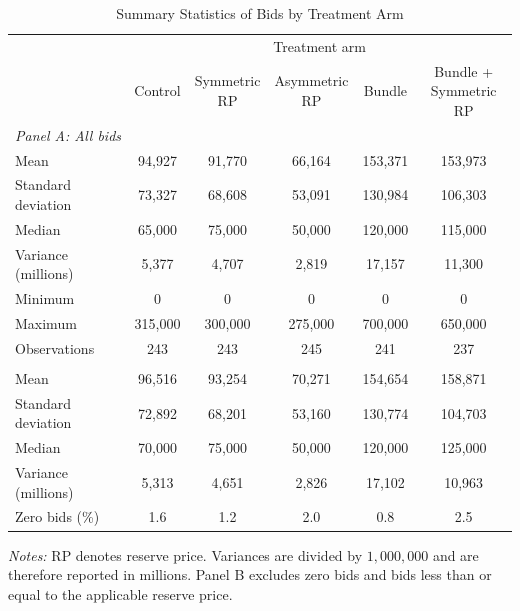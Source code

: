 \documentclass[11pt]{article}
\begin{document}
\begin{table}[!htbp]
\centering
\caption{Summary Statistics of Bids by Treatment Arm}
\label{tab:bid_summary_statistics}

\begin{adjustbox}{max width=\textwidth,
                  max totalheight=0.88\textheight,
                  keepaspectratio}
\begin{threeparttable}
\small
\renewcommand{\arraystretch}{1.10}
\setlength{\tabcolsep}{6pt}

\begin{tabular}{lccccc}
\toprule
& \multicolumn{5}{c}{Treatment arm} \\
\cmidrule(lr){2-6}
& Control
& \makecell{Symmetric\\RP}
& \makecell{Asymmetric\\RP}
& Bundle
& \makecell{Bundle +\\Symmetric RP} \\
\midrule

\multicolumn{6}{l}{\textit{Panel A: All bids}} \\[2pt]
Mean
    & 94,927 & 91,770 & 66,164 & 153,371 & 153,973 \\
Standard deviation
    & 73,327 & 68,608 & 53,091 & 130,984 & 106,303 \\
Median
    & 65,000 & 75,000 & 50,000 & 120,000 & 115,000 \\
Variance (millions)
    & 5,377 & 4,707 & 2,819 & 17,157 & 11,300 \\
Minimum
    & 0 & 0 & 0 & 0 & 0 \\
Maximum
    & 315,000 & 300,000 & 275,000 & 700,000 & 650,000 \\
Observations
    & 243 & 243 & 245 & 241 & 237 \\

\addlinespace
\multicolumn{6}{l}{\textit{Panel B: Bids above the reserve price, excluding zero bids}} \\[2pt]
Mean
    & 96,516 & 93,254 & 70,271 & 154,654 & 158,871 \\
Standard deviation
    & 72,892 & 68,201 & 53,160 & 130,774 & 104,703 \\
Median
    & 70,000 & 75,000 & 50,000 & 120,000 & 125,000 \\
Variance (millions)
    & 5,313 & 4,651 & 2,826 & 17,102 & 10,963 \\
Zero bids (\%)
    & 1.6 & 1.2 & 2.0 & 0.8 & 2.5 \\

\bottomrule
\end{tabular}

\begin{tablenotes}[flushleft]
\footnotesize
\item \textit{Notes:} RP denotes reserve price. Variances are divided by
$1{,}000{,}000$ and are therefore reported in millions. Panel B excludes
zero bids and bids less than or equal to the applicable reserve price.
\end{tablenotes}

\end{threeparttable}
\end{adjustbox}
\end{table}
\end{document}
